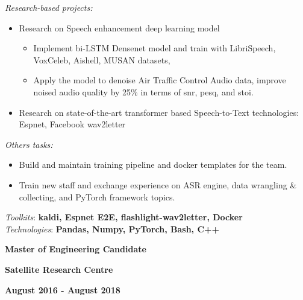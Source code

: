 \documentclass[10pt]{article}
\begin{document}
        \emph{Research-based projects:}
        \vspace{-2.5mm}
        \begin{itemize}[noitemsep]
            \item Research on Speech enhancement deep learning model
                \begin{itemize}[noitemsep]
                    \item Implement bi-LSTM Densenet model and train with LibriSpeech, VoxCeleb, Aishell, MUSAN datasets, 
                    \item Apply the model to denoise Air Traffic Control Audio data, improve noised audio quality by 25\% in terms of snr, pesq, and stoi.
                \end{itemize}
            \item Research on state-of-the-art transformer based Speech-to-Text technologies: Espnet, Facebook wav2letter
        \end{itemize}

        \emph{Others tasks:}
        \vspace{-2.5mm}
        \begin{itemize}[noitemsep]
            \item Build and maintain training pipeline and docker templates for the team.
            \item Train new staff and exchange experience on ASR engine, data wrangling \& collecting, and PyTorch framework topics.
        \end{itemize}
        \emph{Toolkits}: \textbf{kaldi, Espnet E2E, flashlight-wav2letter, Docker} \\
        \emph{Technologies}: \textbf{Pandas, Numpy, PyTorch, Bash, C++}


        \begin{multicols}{3}
            \begin{flushleft}
                \textbf{Master of Engineering Candidate}
            \end{flushleft}

            \columnbreak

            \begin{center}
                \textbf{Satellite Research Centre}
            \end{center}

            \columnbreak

            \begin{flushright}
                \textbf{August 2016 - August 2018}
            \end{flushright}
        \end{multicols}
\end{document}
